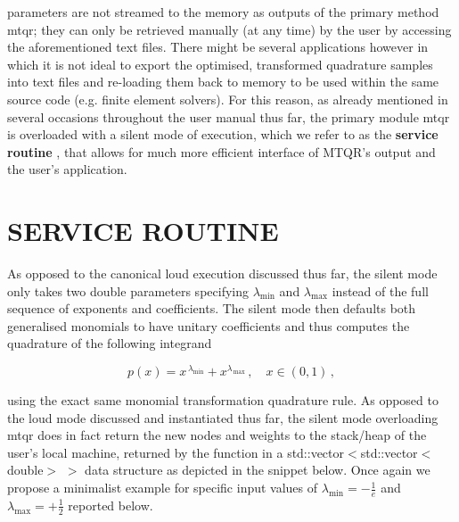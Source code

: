\documentclass[a4paper, twosided]{book}
\begin{document}
parameters are not streamed to the memory as outputs of the primary method \colorbox{poliGrayBlue}{mtqr}; they can only be retrieved manually (at any time) by the user by accessing the aforementioned text files. There might be several applications however in which it is not ideal to export the optimised, transformed quadrature samples into text files and re-loading them back to memory to be used within the same source code (e.g. finite element solvers). For this reason, as already mentioned in several occasions throughout the user manual thus far, the primary module \colorbox{poliGrayBlue}{mtqr} is overloaded with a silent mode of execution, which we refer to as the \color{poliDarkBlue} \textbf{service routine} \color{black}, that allows for much more efficient interface of MTQR's output and the user's application.
 
\section[Service routine]{\changefont SERVICE ROUTINE}\label{Sec3.2.bis}

\noindent
 As opposed to the canonical loud execution discussed thus far, the silent mode only takes two \colorbox{poliGrayBlue}{double} parameters specifying $\lambda_{\text{min}}$ and $\lambda_{\text{max}}$ instead of the full sequence of exponents and coefficients. The silent mode then defaults both generalised monomials to have unitary coefficients and thus computes the quadrature of the following integrand 

\begin{equation*}
    p(x) = x^{\,\lambda_{\text{min}}} + x^{\lambda_{\,\text{max}}}\,,\quad x\in(0,1)\,,
\end{equation*}

\noindent
using the exact same monomial transformation quadrature rule. As opposed to the loud mode discussed and instantiated thus far, the silent mode overloading \colorbox{poliGrayBlue}{mtqr} does in fact return the new nodes and weights to the stack/heap of the user's local machine, returned by the function in a \colorbox{poliGrayBlue}{std::vector$<$std::vector$<$double$>$ $>$} data structure as depicted in the snippet below. Once again we propose a minimalist example for specific input values of $\lambda_{\text{min}} = -\frac{1}{e}$ and $\lambda_{\text{max}} = +\frac{1}{2}$ reported below.


\end{document}
